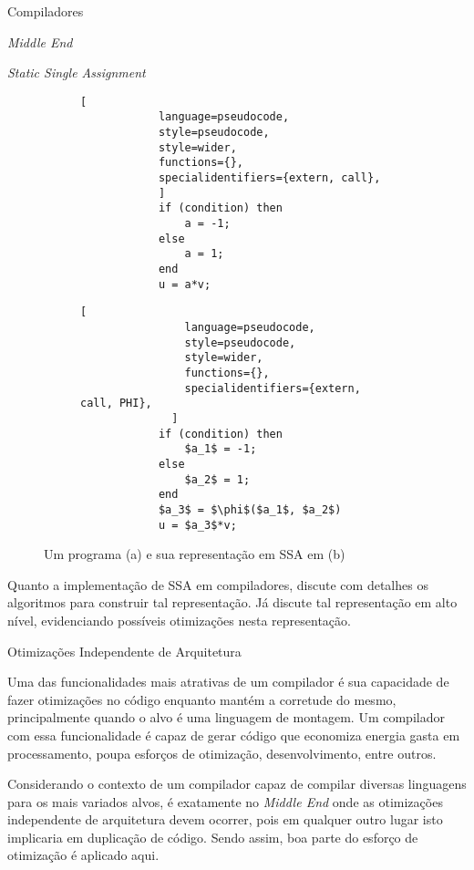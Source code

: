 \begin{section}{Compiladores}
\begin{subsection}{\textit{Middle End}}
\begin{subsubsection}{\textit{Static Single Assignment}}
\begin{figure}[ht]
\begin{subfigure}[b]{0.40\textwidth}
        \begin{lstlisting}[
            language=pseudocode,
            style=pseudocode,
            style=wider,
            functions={},
            specialidentifiers={extern, call},
            ]
            if (condition) then
                a = -1;
            else
                a = 1;
            end
            u = a*v;
        \end{lstlisting}
        \caption{\label{fig:code_normal}}
    \end{subfigure}
    \begin{subfigure}[b]{0.40\textwidth}
        \begin{lstlisting}[
                language=pseudocode,
                style=pseudocode,
                style=wider,
                functions={},
                specialidentifiers={extern, call, PHI},
              ]
            if (condition) then
                $a_1$ = -1;
            else
                $a_2$ = 1;
            end
            $a_3$ = $\phi$($a_1$, $a_2$)
            u = $a_3$*v;
        \end{lstlisting}
        \caption{\label{fig:code_ssa_form}}
\end{subfigure}
\caption{Um programa (a) e sua representação em SSA em (b)}
\end{figure}

Quanto a implementação de SSA em compiladores, \cite{cytron1991efficiently}
discute com detalhes os algoritmos para construir tal representação. Já
\cite{appel2004modern} discute tal representação em alto nível, evidenciando
possíveis otimizações nesta representação.

\end{subsubsection}

\begin{subsubsection}{Otimizações Independente de Arquitetura}

Uma das funcionalidades mais atrativas de um compilador é sua
capacidade de fazer otimizações no código enquanto mantém
a corretude do mesmo, principalmente quando
o alvo é uma linguagem de montagem. Um compilador com essa
funcionalidade é capaz de gerar código que economiza energia
gasta em processamento, poupa esforços de otimização, desenvolvimento,
entre outros.

Considerando o contexto de um compilador capaz de compilar
diversas linguagens para os mais variados alvos, é exatamente
no \textit{Middle End} onde as otimizações independente de
arquitetura devem ocorrer, pois em qualquer outro lugar isto
implicaria em duplicação de código. Sendo assim, boa parte
do esforço de otimização é aplicado aqui.


\end{subsubsection}
\end{subsection}
\end{section}
